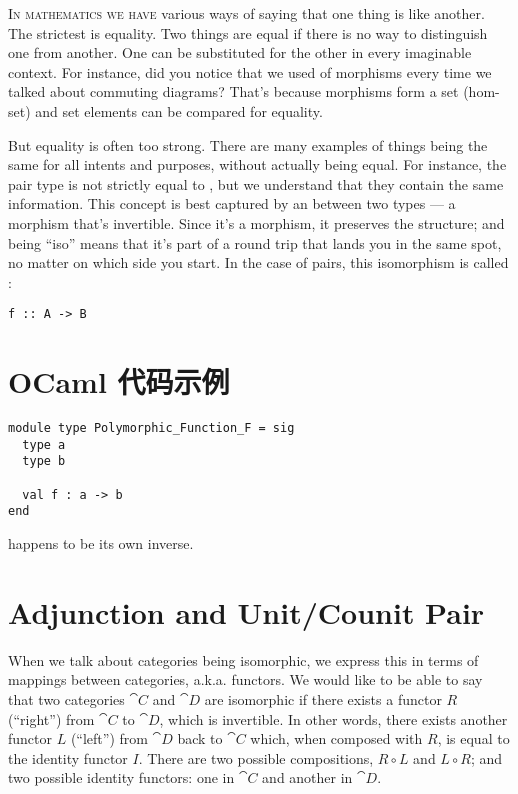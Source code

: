 
\lettrine[lhang=0.17]{I}{n mathematics we have} various ways of saying that one thing is like
another. The strictest is equality. Two things are equal if there is no
way to distinguish one from another. One can be substituted for the
other in every imaginable context. For instance, did you notice that we
used  of morphisms every time we talked about commuting
diagrams? That's because morphisms form a set (hom-set) and set elements
can be compared for equality.

But equality is often too strong. There are many examples of things
being the same for all intents and purposes, without actually being
equal. For instance, the pair type  is not
strictly equal to , but we understand that they
contain the same information. This concept is best captured by an
 between two types --- a morphism that's invertible.
Since it's a morphism, it preserves the structure; and being ``iso''
means that it's part of a round trip that lands you in the same spot, no
matter on which side you start. In the case of pairs, this isomorphism
is called :

\begin{lstlisting}[style=haskellStyle]
f :: A -> B
\end{lstlisting}

\section{OCaml 代码示例}
\begin{lstlisting}[style=ocamlStyle]
module type Polymorphic_Function_F = sig
  type a
  type b

  val f : a -> b
end
\end{lstlisting}

 happens to be its own inverse.

\section{Adjunction and Unit/Counit Pair}

When we talk about categories being isomorphic, we express this in terms
of mappings between categories, a.k.a. functors. We would like to be
able to say that two categories $\cat{C}$ and $\cat{D}$ are isomorphic if
there exists a functor $R$ (``right'') from $\cat{C}$ to $\cat{D}$,
which is invertible. In other words, there exists another functor
$L$ (``left'') from $\cat{D}$ back to $\cat{C}$ which, when
composed with $R$, is equal to the identity functor $I$.
There are two possible compositions, $R \circ L$ and
$L \circ R$; and two possible identity functors: one in $\cat{C}$
and another in $\cat{D}$.


